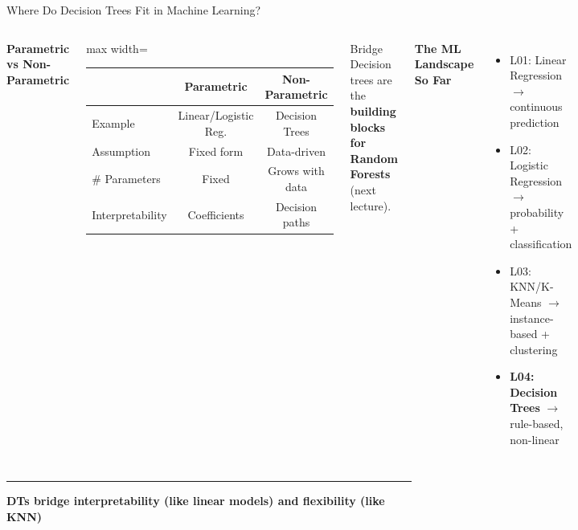 \documentclass[8pt,aspectratio=169]{beamer}
\newcommand{\bottomnote}[1]{%
\vfill
\vspace{-2mm}
\textcolor{mllavender2}{\rule{\textwidth}{0.4pt}}
\vspace{1mm}
\footnotesize
\textbf{#1}
}
\newenvironment{compactlist}{%
  \begin{itemize}%
    \setlength{\itemsep}{2pt}%
    \setlength{\parskip}{0pt}%
    \setlength{\parsep}{0pt}%
}{%
  \end{itemize}%
}
\newcommand{\highlight}[1]{\textcolor{mlorange}{\textbf{#1}}}
\begin{document}
\begin{frame}[t]{Where Do Decision Trees Fit in Machine Learning?}
\begin{columns}[T]
\small
\textbf{Parametric vs Non-Parametric}

\vspace{1mm}
\footnotesize
\begin{adjustbox}{max width=\columnwidth}
\begin{tabular}{lcc}
\toprule
& \textbf{Parametric} & \textbf{Non-Parametric} \\
\midrule
Example & Linear/Logistic Reg. & Decision Trees \\
\rowcolor{mllavender4}
Assumption & Fixed form & Data-driven \\
\# Parameters & Fixed & Grows with data \\
\rowcolor{mllavender4}
Interpretability & Coefficients & Decision paths \\
\bottomrule
\end{tabular}
\end{adjustbox}

\vspace{3mm}
\begin{block}{Bridge}
\footnotesize Decision trees are the \highlight{building blocks for Random Forests} (next lecture).
\end{block}

\footnotesize
\textbf{The ML Landscape So Far}
\begin{compactlist}
\item \footnotesize L01: Linear Regression $\to$ continuous prediction
\item \footnotesize L02: Logistic Regression $\to$ probability + classification
\item \footnotesize L03: KNN/K-Means $\to$ instance-based + clustering
\item \footnotesize \textbf{L04: Decision Trees} $\to$ rule-based, non-linear
\end{compactlist}
\end{columns}
\bottomnote{DTs bridge interpretability (like linear models) and flexibility (like KNN)}
\end{frame}

\end{document}
